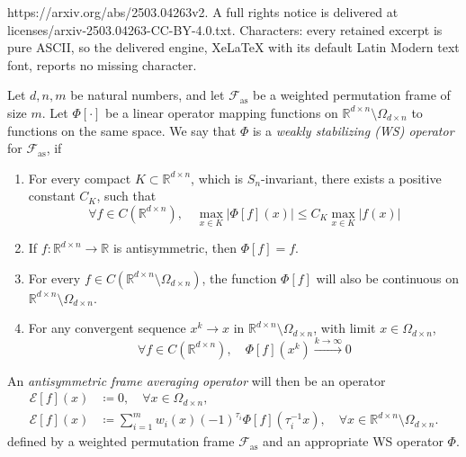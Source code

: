 \documentclass[10pt,a4paper]{amsart}
\newcommand{\RR}{\mathbb{R}}
\newcommand{\abs}[1]{\left\lvert#1\right\rvert}
\begin{document}
https://arxiv.org/abs/2503.04263v2. A full rights notice is delivered at licenses/arxiv-2503.04263-CC-BY-4.0.txt. Characters: every retained excerpt is pure ASCII, so the delivered engine, XeLaTeX with its default Latin Modern text font, reports no missing character.
\begin{defn} \label{def:afa}
Let $d,n,m$ be natural numbers, and let $\mathcal{F}_{\text{as}}$ be a weighted permutation frame of size $m$. Let  $\Phi[\cdot]$ be a linear operator mapping functions on $\RR^{d\times n}\setminus \Omega_{d\times n}$ to functions on the same space. We say that $\Phi $ is a \textit{weakly stabilizing (WS) operator} for $\mathcal{F}_{\text{as}}$, if
\begin{enumerate}

\item For every compact $K \subset \RR^{d \times n}$, which is $S_n$-invariant, there exists a positive constant $C_K$, such that
  \begin{equation} \label{eq:cond_bound_antis}
    \forall f\in  C\left(\RR^{d \times n}\right), \quad   \max_{x \in K}{\abs{\Phi[f](x)}} \leq C_K \max_{x \in K}{\abs{f(x)}}
  \end{equation}
  \item If $f:\RR^{d\times n} \to \RR$ is antisymmetric, then $\Phi[f] = f$.
    \item \label{cond:proj} For every $f\in  C\left(\RR^{d \times n} \setminus \Omega_{d\times n} \right)$, the function $\Phi[f]$ will also be continuous on $\RR^{d\times n}\setminus \Omega_{d\times n} $.
    \item For any convergent sequence 
  $x^k \to x$ in $\RR^{d \times n} \setminus{\Omega_{d \times n}}$, with limit $x \in \Omega_{d \times n}$,
  \begin{equation} \label{eq:cond_weak_convergence}
\forall f\in  C\left(\RR^{d \times n}\right), \quad     \Phi[f]\left(x^k \right)  \stackrel{k \to \infty}{\rightarrow} 0
  \end{equation}

\end{enumerate}
An \emph{antisymmetric frame averaging operator} will then be an operator
\begin{equation} \label{eq:form2frame}
    \begin{split}
        \mathcal{E}[f](x) &\coloneq 0, \quad \forall x \in \Omega_{d \times n}, \\
        \mathcal{E}[f](x) &\coloneq \sum_{i=1}^{m}{w_i(x)(-1)^{\tau_i}\Phi[f]\left( \tau_i^{-1} x \right)}, \quad \forall x \in \RR^{d \times n} \setminus{\Omega_{d \times n}}.
    \end{split}
    \end{equation}
    defined by a weighted permutation frame $\mathcal{F}_{\text{as}}$ and an appropriate WS operator $\Phi$. 
\end{defn}
\end{document}
